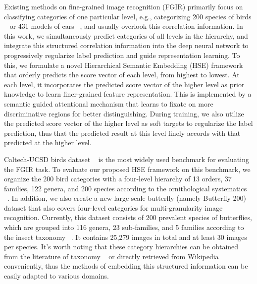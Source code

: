 \documentclass[sigconf]{acmart}
\begin{document}
Existing methods on fine-grained image recognition (FGIR) primarily focus on classifying categories of one particular level, e.g., categorizing 200 species of birds ~\cite{lin2015bilinear,zheng2017learning} or 431 models of cars ~\cite{hu2017deep}, and usually overlook this correlation information. In this work, we simultaneously predict categories of all levels in the hierarchy, and integrate this structured correlation information into the deep neural network to progressively regularize label prediction and guide representation learning. To this, we formulate a novel Hierarchical Semantic Embedding (HSE) framework that orderly predicts the score vector of each level, from highest to lowest. At each level, it incorporates the predicted score vector of the higher level as prior knowledge to learn finer-grained feature representation. This is implemented by a semantic guided attentional mechanism that learns to fixate on more discriminative regions for better distinguishing. During training, we also utilize the predicted score vector of the higher level as soft targets to regularize the label prediction, thus that the predicted result at this level finely accords with that predicted at the higher level. 

Caltech-UCSD birds dataset ~\cite{wah2011caltech} is the most widely used benchmark for evaluating the FGIR task. To evaluate our proposed HSE framework on this benchmark, we organize the 200 bird categories with a four-level hierarchy of 13 orders, 37 families, 122 genera, and 200 species according to the ornithological systematics ~\cite{salvador2017taxonomy,remsen2016revised}. In addition, we also create a new large-scale butterfly (namely Butterfly-200) dataset that also covers four-level categories for multi-granularity image recognition. Currently, this dataset consists of 200 prevalent species of butterflies, which are grouped into 116 genera, 23 sub-families, and 5 families according to the insect taxonomy ~\cite{verovnik2013annotated,sambhu2018butterflies}. It contains 25,279 images in total and at least 30 images per species. It's worth noting that these category hierarchies can be obtained from the literature of taxonomy ~\cite{salvador2017taxonomy,verovnik2013annotated} or directly retrieved from Wikipedia conveniently, thus the methods of embedding this structured information can be easily adapted to various domains.
\end{document}
